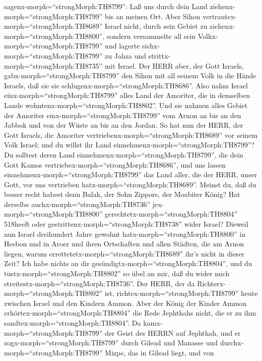sagenx-morph=``strongMorph:TH8799'': Laß uns durch dein Land
ziehenx-morph=``strongMorph:TH8799'' bis an meinen Ort. 
Aber Sihon vertrautex-morph=``strongMorph:TH8689'' Israel nicht, durch
sein Gebiet zu ziehenx-morph=``strongMorph:TH8800'', sondern versammelte
all sein Volkx-morph=``strongMorph:TH8799'' und lagerte
sichx-morph=``strongMorph:TH8799'' zu Jahza und
strittx-morph=``strongMorph:TH8735'' mit Israel.  Der HERR
aber, der Gott Israels, gabx-morph=``strongMorph:TH8799'' den Sihon mit
all seinem Volk in die Hände Israels, daß sie sie
schlugenx-morph=``strongMorph:TH8686''. Also nahm Israel
einx-morph=``strongMorph:TH8799'' alles Land der Amoriter, die in
demselben Lande wohntenx-morph=``strongMorph:TH8802''.  Und
sie nahmen alles Gebiet der Amoriter einx-morph=``strongMorph:TH8799''
vom Arnon an bis an den Jabbok und von der Wüste an bis an den Jordan.
 So hat nun der HERR, der Gott Israels, die Amoriter
vertriebenx-morph=``strongMorph:TH8689'' vor seinem Volk Israel; und du
willst ihr Land einnehmenx-morph=``strongMorph:TH8799''? 
Du solltest deren Land einnehmenx-morph=``strongMorph:TH8799'', die dein
Gott Kamos vertriebex-morph=``strongMorph:TH8686'', und uns lassen
einnehmenx-morph=``strongMorph:TH8799'' das Land aller, die der HERR,
unser Gott, vor uns vertrieben hatx-morph=``strongMorph:TH8689''.
 Meinst du, daß du besser recht habest denn Balak, der Sohn
Zippors, der Moabiter König? Hat derselbe
auchx-morph=``strongMorph:TH8736'' jex-morph=``strongMorph:TH8800''
gerechtetx-morph=``strongMorph:TH8804'' 518heeft oder
gestrittenx-morph=``strongMorph:TH8738'' wider Israel? 
Dieweil nun Israel dreihundert Jahre gewohnt
hatx-morph=``strongMorph:TH8800'' in Hesbon und in Aroer und ihren
Ortschaften und allen Städten, die am Arnon liegen, warum
errettetetx-morph=``strongMorph:TH8689'' ihr's nicht in dieser Zeit?
 Ich habe nichts an dir
gesündigtx-morph=``strongMorph:TH8804'', und du
tustx-morph=``strongMorph:TH8802'' so übel an mir, daß du wider mich
streitestx-morph=``strongMorph:TH8736''. Der HERR, der da
Richterx-morph=``strongMorph:TH8802'' ist,
richtex-morph=``strongMorph:TH8799'' heute zwischen Israel und den
Kindern Ammon.  Aber der König der Kinder Ammon
erhörtex-morph=``strongMorph:TH8804'' die Rede Jephthahs nicht, die er
zu ihm sandtex-morph=``strongMorph:TH8804''.  Da
kamx-morph=``strongMorph:TH8799'' der Geist des HERRN auf Jephthah, und
er zogx-morph=``strongMorph:TH8799'' durch Gilead und Manasse und
durchx-morph=``strongMorph:TH8799'' Mizpe, das in Gilead liegt, und von
